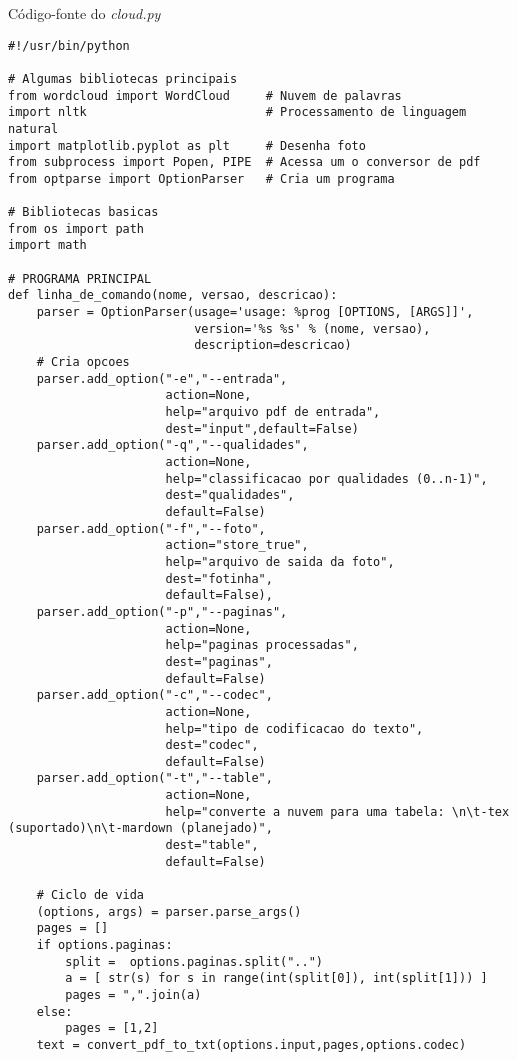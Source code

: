 \begin{example}{Código-fonte do \emph{cloud.py}}\label{ex:cloud}
\begin{verbatim}
#!/usr/bin/python

# Algumas bibliotecas principais
from wordcloud import WordCloud     # Nuvem de palavras
import nltk                         # Processamento de linguagem natural
import matplotlib.pyplot as plt     # Desenha foto
from subprocess import Popen, PIPE  # Acessa um o conversor de pdf
from optparse import OptionParser   # Cria um programa

# Bibliotecas basicas
from os import path
import math

# PROGRAMA PRINCIPAL
def linha_de_comando(nome, versao, descricao): 
    parser = OptionParser(usage='usage: %prog [OPTIONS, [ARGS]]', 
                          version='%s %s' % (nome, versao), 
                          description=descricao)
    # Cria opcoes
    parser.add_option("-e","--entrada",
                      action=None,
                      help="arquivo pdf de entrada",
                      dest="input",default=False)
    parser.add_option("-q","--qualidades",
                      action=None,
                      help="classificacao por qualidades (0..n-1)",
                      dest="qualidades",
                      default=False)
    parser.add_option("-f","--foto",
                      action="store_true", 
                      help="arquivo de saida da foto",
                      dest="fotinha",
                      default=False),
    parser.add_option("-p","--paginas",
                      action=None,
                      help="paginas processadas",
                      dest="paginas",
                      default=False)
    parser.add_option("-c","--codec",
                      action=None,
                      help="tipo de codificacao do texto",
                      dest="codec",
                      default=False)
    parser.add_option("-t","--table",
                      action=None,
                      help="converte a nuvem para uma tabela: \n\t-tex (suportado)\n\t-mardown (planejado)",
                      dest="table",
                      default=False)

    # Ciclo de vida
    (options, args) = parser.parse_args()
    pages = []
    if options.paginas:
        split =  options.paginas.split("..") 
        a = [ str(s) for s in range(int(split[0]), int(split[1])) ]
        pages = ",".join(a)
    else:
        pages = [1,2]
    text = convert_pdf_to_txt(options.input,pages,options.codec)
    

\end{verbatim}
\end{example}
